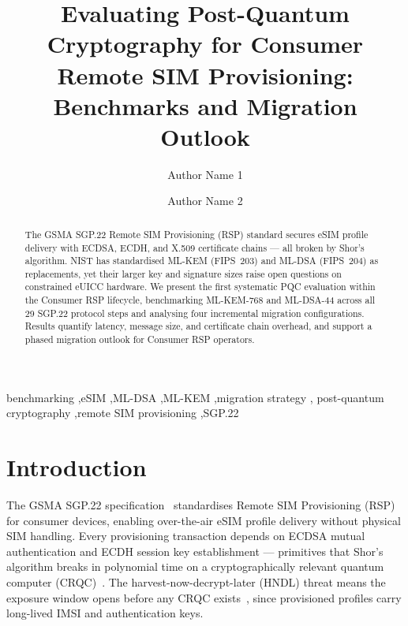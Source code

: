 \documentclass[final,3p,times,twocolumn]{elsarticle}
\begin{document}
\begin{frontmatter}

\title{Evaluating Post-Quantum Cryptography for Consumer Remote SIM
Provisioning: Benchmarks and Migration Outlook\tnotemark[t1]}


\author[1]{Author Name 1}

\author[1]{Author Name 2}

\address[1]{Organization, Department, City, Postcode, Country}


\begin{abstract}
The GSMA SGP.22 Remote SIM Provisioning (RSP) standard secures eSIM profile
delivery with ECDSA, ECDH, and X.509 certificate chains — all broken by
Shor's algorithm.  NIST has standardised ML-KEM (FIPS~203) and ML-DSA
(FIPS~204) as replacements, yet their larger key and signature sizes raise
open questions on constrained eUICC hardware.  We present the first
systematic PQC evaluation within the Consumer RSP lifecycle, benchmarking
ML-KEM-768 and ML-DSA-44 across all 29 SGP.22 protocol steps and analysing
four incremental migration configurations.  Results quantify latency, message
size, and certificate chain overhead, and support a phased migration outlook
for Consumer RSP operators.
\end{abstract}

\begin{keyword}
benchmarking \sep eSIM \sep ML-DSA \sep ML-KEM \sep migration strategy \sep
post-quantum cryptography \sep remote SIM provisioning \sep SGP.22
\end{keyword}

\end{frontmatter}

\section{Introduction}\label{sec:intro}

The GSMA SGP.22 specification~\citep{gsma_sgp22_v26} standardises Remote SIM
Provisioning (RSP) for consumer devices, enabling over-the-air eSIM profile
delivery without physical SIM handling.  Every provisioning transaction depends
on ECDSA mutual authentication and ECDH session key establishment — primitives
that Shor's algorithm breaks in polynomial time on a cryptographically relevant
quantum computer (CRQC)~\citep{shor1994algorithms}.  The harvest-now-decrypt-later
(HNDL) threat means the exposure window opens before any CRQC
exists~\citep{mosca2018cybersecurity}, since provisioned profiles carry long-lived
IMSI and authentication keys.
\end{document}

